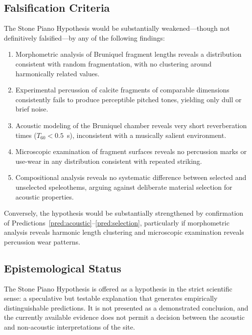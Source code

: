 \documentclass[12pt]{article}
\begin{document}
\subsection{Falsification Criteria}

The Stone Piano Hypothesis would be substantially weakened—though not definitively falsified—by any of the following findings:

\begin{enumerate}
\item Morphometric analysis of Bruniquel fragment lengths reveals a distribution consistent with random fragmentation, with no clustering around harmonically related values.
\item Experimental percussion of calcite fragments of comparable dimensions consistently fails to produce perceptible pitched tones, yielding only dull or brief noise.
\item Acoustic modeling of the Bruniquel chamber reveals very short reverberation times ($T_{60} < 0.5$~s), inconsistent with a musically salient environment.
\item Microscopic examination of fragment surfaces reveals no percussion marks or use-wear in any distribution consistent with repeated striking.
\item Compositional analysis reveals no systematic difference between selected and unselected speleothems, arguing against deliberate material selection for acoustic properties.
\end{enumerate}

Conversely, the hypothesis would be substantially strengthened by confirmation of Predictions~\ref{pred:acoustic}--\ref{pred:selection}, particularly if morphometric analysis reveals harmonic length clustering and microscopic examination reveals percussion wear patterns.

\subsection{Epistemological Status}

The Stone Piano Hypothesis is offered as a hypothesis in the strict scientific sense: a speculative but testable explanation that generates empirically distinguishable predictions. It is not presented as a demonstrated conclusion, and the currently available evidence does not permit a decision between the acoustic and non-acoustic interpretations of the site.
\end{document}
